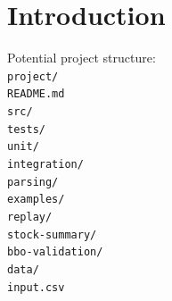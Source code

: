 \section{Introduction}
Potential project structure:\vspace{1em}\\ \texttt{project/\\
	\hspace*{1em}README.md\\ \hspace*{1em}src/\\ \hspace*{1em}tests/\\
	\hspace*{2em}unit/\\ \hspace*{2em}integration/\\ \hspace*{2em}parsing/\\
	\hspace*{1em}examples/\\ \hspace*{2em}replay/\\ \hspace*{2em}stock-summary/\\
	\hspace*{2em}bbo-validation/\\ \hspace*{1em}data/\\ \hspace*{2em}input.csv}\\
\vspace{1em}
